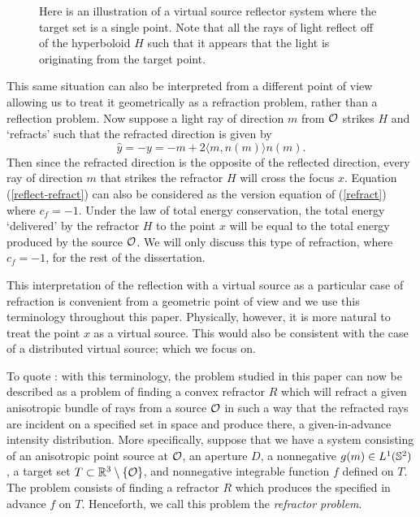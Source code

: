 \documentclass[review]{elsarticle}
\begin{document}
\begin{figure}[htbp]
\centering
\label{figure_virtual-source}
\def\svgwidth{0.9\textwidth}

\caption[Virtual Source Reflector Illustration]{Here is an illustration of a virtual source reflector system where the target set is a single point. Note that all the rays of light reflect off of the hyperboloid $H$ such that it appears that the light is originating from the target point. }
\end{figure}


This same situation can also be interpreted from a different point of view allowing us to treat it geometrically as a refraction problem, rather than a reflection problem. Now suppose a light ray of direction $m$ from $\mathcal{O}$ strikes $H$ and `refracts' such that the refracted direction is given by
\begin{equation}\label{reflect-refract}
    \hat{y}=-{y}=-m+2\langle m,n(m)\rangle n(m).
\end{equation}
Then since the refracted direction is the opposite of the reflected direction, every ray of direction $m$ that strikes the refractor $H$ will cross the focus $x$. Equation (\ref{reflect-refract}) can also be considered as the version equation of (\ref{refract}) where $c_f=-1.$ Under the law of total energy conservation, the total energy `delivered' by the refractor $H$ to the point $x$ will be equal to the total energy produced by the source $\mathcal{O}$. We will only discuss this type of refraction, where $c_f=-1$, for the rest of the dissertation.

This interpretation of the reflection with a virtual source as a particular case of refraction is convenient from a geometric point of view and we use this terminology throughout this paper. Physically, however, it is more natural to treat the point $x$ as a virtual source. This would also be consistent with the case of a distributed virtual source; which we focus on. 

To quote \cite{KOT}: with this terminology, the problem studied in this paper can now be described as a problem of finding a convex refractor $R$ which will refract a given anisotropic bundle of rays from a source $\mathcal{O}$ in such a way that the refracted rays are incident on a specified set in space and produce there, a given-in-advance intensity distribution. More specifically, suppose that we have a system consisting of an anisotropic point source at $\mathcal{O}$, an aperture $D$, a nonnegative $g(m)\in L^1(\mathbb{S}^2)$, a target set $T\subset \mathbb{R}^3\setminus\{\mathcal{O}\}$, and nonnegative integrable function $f$ defined on $T.$ The problem consists of finding a refractor $R$ which produces the specified in advance $f$ on $T.$ Henceforth, we call this problem the {\it refractor problem}.
\end{document}
